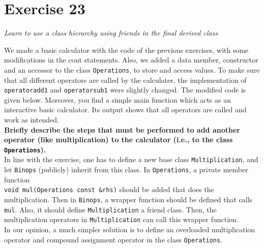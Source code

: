 \documentclass[12pt]{article}
\newcommand{\desc}[1]{\textit{#1} \vspace{1em}}
\begin{document}


\clearpage

\section*{Exercise 23}
\desc{Learn to use a class hierarchy using friends in the final derived class}

We made a basic calculator with the code of the previous exercises, with some modifications in the cout statements. Also, we added a data member, constructor and an accessor to the class \texttt{Operations}, to store and access values. To make sure that all different operators are called by the calculater, the implementation of \texttt{operatoradd1} and \texttt{operatorsub1} were slightly changed. The modified code is given below. Moreover, you find a simple main function which acts as an interactive basic calculator. Its output shows that all operators are called and work as intended.\\

\textbf{Briefly describe the steps that must be performed to add another operator (like multiplication) to the calculator (i.e., to the class \texttt{Operations}).} \\
In line with the exercise, one has to define a new base class \texttt{Multiplication}, and let \texttt{Binops} (publicly) inherit from this class. In \texttt{Operations}, a private member function \\\texttt{void mul(Operations const \&rhs)} should be added that does the multiplication. Then in \texttt{Binops}, a wrapper function should be defined that calls \texttt{mul}. Also, it should define \texttt{Multiplication} a friend class. Then, the multiplication operators in \texttt{Multiplication} can call this wrapper function. \\
In our opinion, a much simpler solution is to define an overloaded multiplication operator and compound assignment operator in the class \texttt{Operations}.  






\end{document}

